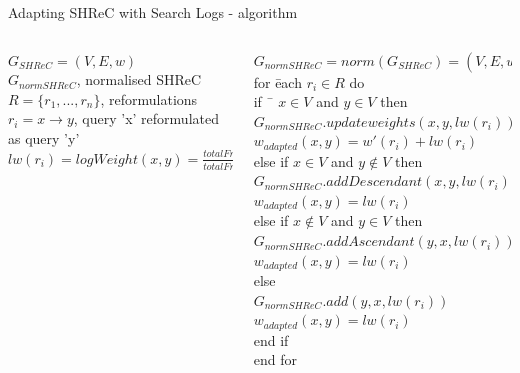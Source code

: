\begin{frame}{Adapting SHReC with Search Logs - algorithm}

\begin{scriptsize}
	\begin{columns}
		\begin{column}[l]{0.5\textwidth}
			$ G_{SHReC} = (V, E, w) $ \\
			$ G_{normSHReC} $, normalised SHReC \\
			$ R = \{r_{1}, ..., r_{n}\} $, reformulations \\
			$ r_{i} = x \rightarrow y $, query 'x' reformulated as query 'y' \\
			$ lw(r_{i}) = logWeight(x, y) = \frac{totalFreq(x \rightarrow y)}{totalFreq(x \rightarrow *)} $ \\
		\end{column}

		\begin{column}[l]{0.5\textwidth}
			\begin{tabbing}
				$ G_{normSHReC} = norm(G_{SHReC}) = (V, E, w_{adapted}, w') $ \\
				for \= each $ r_{i} \in R $ do \\
				\>	if \ \= $ x \in V $ and $ y \in V $ then \\
				\>	\>	$ G_{normSHReC}.updateweights(x, y, lw(r_{i})) $ \\
				\>	\>	$ w_{adapted}(x, y) = w'(r_{i}) + lw(r_{i}) $ \\
				\>	else if $ x \in V $ and $ y \notin V $ then \\
				\>	\>	$ G_{normSHReC}.addDescendant(x, y, lw(r_{i})) $ \\
				\>	\>	$ w_{adapted}(x, y) = lw(r_{i}) $ \\
				\>	else if $ x \notin V $ and $ y \in V $ then \\
				\>	\>	$ G_{normSHReC}.addAscendant(y, x, lw(r_{i})) $ \\
				\>	\>	$ w_{adapted}(x, y) = lw(r_{i}) $ \\
				\>	else \\
				\>	\>	$ G_{normSHReC}.add(y, x, lw(r_{i})) $ \\
				\>	\>	$ w_{adapted}(x, y) = lw(r_{i}) $ \\
				\>	end if \\
				end for \\
			\end{tabbing}
		\end{column}
	\end{columns}
\end{scriptsize}

\end{frame}


